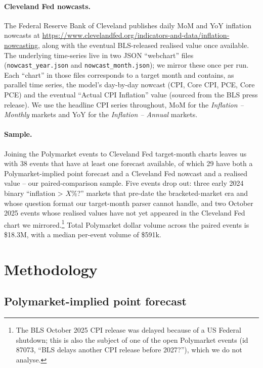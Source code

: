 \documentclass{article}
\begin{document}
\paragraph{Cleveland Fed nowcasts.}  The Federal Reserve Bank of
Cleveland publishes daily MoM and YoY inflation nowcasts at
\url{https://www.clevelandfed.org/indicators-and-data/inflation-nowcasting},
along with the eventual BLS-released realised value once available.
The underlying time-series live in two JSON ``webchart'' files
(\texttt{nowcast\_year.json} and \texttt{nowcast\_month.json}); we
mirror these once per run.  Each ``chart'' in those files corresponds
to a target month and contains, as parallel time series, the model's
day-by-day nowcast (CPI, Core CPI, PCE, Core PCE) and the eventual
``Actual CPI Inflation'' value (sourced from the BLS press release).
We use the headline CPI series throughout, MoM for the
\emph{Inflation -- Monthly} markets and YoY for the
\emph{Inflation -- Annual} markets.

\paragraph{Sample.}  Joining the Polymarket events to Cleveland Fed
target-month charts leaves us with 38 events that have at least one
forecast available, of which 29 have both a Polymarket-implied point
forecast and a Cleveland Fed nowcast and a realised value -- our
paired-comparison sample.  Five events drop out: three early 2024
binary ``inflation > $X$\%?'' markets that pre-date the
bracketed-market era and whose question format our target-month parser
cannot handle, and two October 2025 events whose realised values have
not yet appeared in the Cleveland Fed chart we mirrored.\footnote{The
BLS October 2025 CPI release was delayed because of a US Federal
shutdown; this is also the subject of one of the open Polymarket
events (id 87073, ``BLS delays another CPI release before 2027?''),
which we do not analyse.}  Total Polymarket dollar volume across
the paired events is \$18.3M, with a median per-event volume of
\$591k.

\section{Methodology}

\subsection{Polymarket-implied point forecast}
\end{document}
